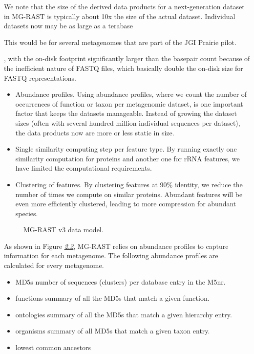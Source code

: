 \documentclass[letterpaper,10pt,english]{sphinxmanual}
\begin{document}
We note that the size of the derived data products for a next-generation
dataset in MG-RAST is typically about 10x the size of the actual
dataset. Individual datasets now may be as large as a terabase %
\begin{footnote}[3]\sphinxAtStartFootnote
This would be for several metagenomes that are part of the JGI
Prairie pilot.
%
\end{footnote},
with the on-disk footprint significantly larger than the basepair count
because of the inefficient nature of FASTQ files, which basically double
the on-disk size for FASTQ representations.
\begin{itemize}
\item {} 
Abundance profiles. Using abundance profiles, where we count the
number of occurrences of function or taxon per metagenomic dataset,
is one important factor that keeps the datasets manageable. Instead
of growing the dataset sizes (often with several hundred million
individual sequences per dataset), the data products now are more or
less static in size.

\item {} 
Single similarity computing step per feature type. By running exactly
one similarity computation for proteins and another one for rRNA
features, we have limited the computational requirements.

\item {} 
Clustering of features. By clustering features at 90\% identity, we
reduce the number of times we compute on similar proteins. Abundant
features will be even more efficiently clustered, leading to more
compression for abundant species.

\end{itemize}

\begin{figure}[htbp]
\centering
\capstart

\noindent{}
\caption{MG-RAST v3 data model.}\label{\detokenize{user_manual:fig-data-model}}\end{figure}

As shown in Figure {\hyperref[\detokenize{user_manual:fig:data-model}]{\emph{2.2}}}, MG-RAST relies on
abundance profiles to capture information for each metagenome. The
following abundance profiles are calculated for every metagenome.
\begin{itemize}
\item {} 
MD5s \textendash{} number of sequences (clusters) per database entry in the M5nr.

\item {} 
functions \textendash{} summary of all the MD5s that match a given function.

\item {} 
ontologies \textendash{} summary of all the MD5s that match a given hierarchy
entry.

\item {} 
organisms \textendash{} summary of all MD5s that match a given taxon entry.

\item {} 
lowest common ancestors

\end{itemize}
\end{document}

